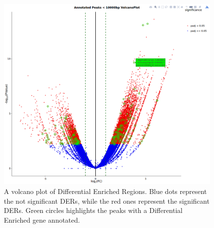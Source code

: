 \begin{figure}[H]
\centering
\includegraphics[width=\textwidth, height=\textheight, keepaspectratio]{img/descan2/Annotated_depeaks_degenes.png}
\caption[Annotated Differential Enrichment Regions Volcano]{A volcano plot of Differential Enriched Regions. Blue dots represent the not significant DERs, while the red ones represent the significant DERs. Green circles highlights the peaks with a Differential Enriched gene annotated.}
\label{fig:depeakdegenessdescan}
\centering
\end{figure}








